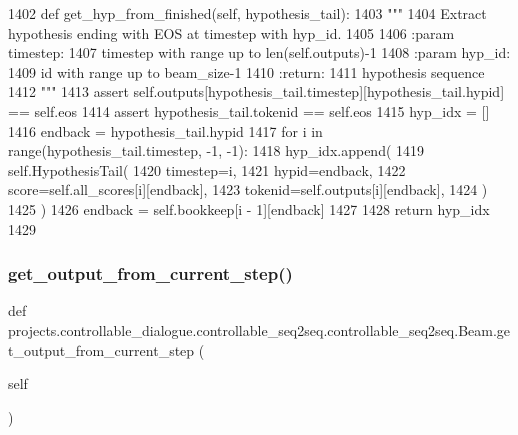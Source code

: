 \begin{DoxyCode}
1402     \textcolor{keyword}{def }get\_hyp\_from\_finished(self, hypothesis\_tail):
1403         \textcolor{stringliteral}{"""}
1404 \textcolor{stringliteral}{        Extract hypothesis ending with EOS at timestep with hyp\_id.}
1405 \textcolor{stringliteral}{}
1406 \textcolor{stringliteral}{        :param timestep:}
1407 \textcolor{stringliteral}{            timestep with range up to len(self.outputs)-1}
1408 \textcolor{stringliteral}{        :param hyp\_id:}
1409 \textcolor{stringliteral}{            id with range up to beam\_size-1}
1410 \textcolor{stringliteral}{        :return:}
1411 \textcolor{stringliteral}{            hypothesis sequence}
1412 \textcolor{stringliteral}{        """}
1413         \textcolor{keyword}{assert} self.outputs[hypothesis\_tail.timestep][hypothesis\_tail.hypid] == self.eos
1414         \textcolor{keyword}{assert} hypothesis\_tail.tokenid == self.eos
1415         hyp\_idx = []
1416         endback = hypothesis\_tail.hypid
1417         \textcolor{keywordflow}{for} i \textcolor{keywordflow}{in} range(hypothesis\_tail.timestep, -1, -1):
1418             hyp\_idx.append(
1419                 self.HypothesisTail(
1420                     timestep=i,
1421                     hypid=endback,
1422                     score=self.all\_scores[i][endback],
1423                     tokenid=self.outputs[i][endback],
1424                 )
1425             )
1426             endback = self.bookkeep[i - 1][endback]
1427 
1428         \textcolor{keywordflow}{return} hyp\_idx
1429 
\end{DoxyCode}
\mbox{\label{classprojects_1_1controllable__dialogue_1_1controllable__seq2seq_1_1controllable__seq2seq_1_1Beam_a2ed0d78713409a6ded788ece3d325b0c}} 
\subsubsection{\texorpdfstring{get\+\_\+output\+\_\+from\+\_\+current\+\_\+step()}{get\_output\_from\_current\_step()}}
{\footnotesize\ttfamily def projects.\+controllable\+\_\+dialogue.\+controllable\+\_\+seq2seq.\+controllable\+\_\+seq2seq.\+Beam.\+get\+\_\+output\+\_\+from\+\_\+current\+\_\+step (\begin{DoxyParamCaption}\item[{}]{self }\end{DoxyParamCaption})}

